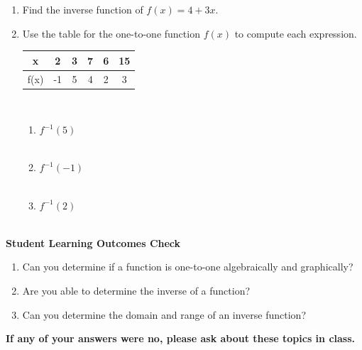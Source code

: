 \begin{enumerate}
 
 \item Find the inverse function of $f(x) = 4 + 3x$. \\[1.2in]
 
 
 \vfill
 
  
\item Use the table for the one-to-one function $f(x)$ to compute each expression.\\[.2in]
\begin{tabular}{| c |  c | c | c | c | c | }
\hline x & 2 & 3&7 &6 & 15\\ \hline
f(x) &-1 &5 &4 &2 & 3\\ \hline
\end{tabular} 
\\
\begin{enumerate}
\item $f^{-1} (5)$ \\ \\
\item $f^{-1} (-1)$ \\ \\
\item $f^{-1} (2)$ \\ \\

\end{enumerate}




\end{enumerate}

\noindent \textbf{Student Learning Outcomes Check}

\begin{enumerate}
\item Can you determine if a function is one-to-one algebraically and graphically?
\item Are you able to determine the inverse of a function?
\item Can you determine the domain and range of an inverse function?

\end{enumerate}

\noindent \textbf{If any of your answers were no, please ask about these topics in class.}



